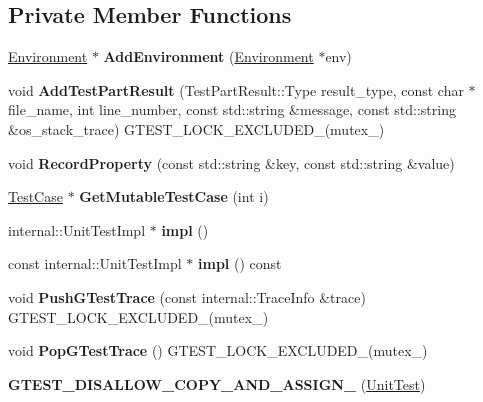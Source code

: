 \subsection*{Private Member Functions}
\begin{DoxyCompactItemize}
\item 
\mbox{\label{classtesting_1_1_unit_test_a1eb8e999b8696889bf1c64b4f0161203}} 
\mbox{\hyperlink{classtesting_1_1_environment}{Environment}} $\ast$ {\bfseries Add\+Environment} (\mbox{\hyperlink{classtesting_1_1_environment}{Environment}} $\ast$env)
\item 
\mbox{\label{classtesting_1_1_unit_test_a1d157d2e9a5c1d3405333410c6b13932}} 
void {\bfseries Add\+Test\+Part\+Result} (Test\+Part\+Result\+::\+Type result\+\_\+type, const char $\ast$file\+\_\+name, int line\+\_\+number, const std\+::string \&message, const std\+::string \&os\+\_\+stack\+\_\+trace) G\+T\+E\+S\+T\+\_\+\+L\+O\+C\+K\+\_\+\+E\+X\+C\+L\+U\+D\+E\+D\+\_\+(mutex\+\_\+)
\item 
\mbox{\label{classtesting_1_1_unit_test_a2c96a4a02c34095e07c6999e7686367f}} 
void {\bfseries Record\+Property} (const std\+::string \&key, const std\+::string \&value)
\item 
\mbox{\label{classtesting_1_1_unit_test_ad741830280b12c07874b2d37a6ee5c02}} 
\mbox{\hyperlink{classtesting_1_1_test_case}{Test\+Case}} $\ast$ {\bfseries Get\+Mutable\+Test\+Case} (int i)
\item 
\mbox{\label{classtesting_1_1_unit_test_a4df5d11a58affb337d7fa62eaa07690e}} 
internal\+::\+Unit\+Test\+Impl $\ast$ {\bfseries impl} ()
\item 
\mbox{\label{classtesting_1_1_unit_test_a266a9f49070d1959c1c9d649423879b4}} 
const internal\+::\+Unit\+Test\+Impl $\ast$ {\bfseries impl} () const
\item 
\mbox{\label{classtesting_1_1_unit_test_af455b953108ff09b3b6e41011653e78a}} 
void {\bfseries Push\+G\+Test\+Trace} (const internal\+::\+Trace\+Info \&trace) G\+T\+E\+S\+T\+\_\+\+L\+O\+C\+K\+\_\+\+E\+X\+C\+L\+U\+D\+E\+D\+\_\+(mutex\+\_\+)
\item 
\mbox{\label{classtesting_1_1_unit_test_a70b3e3282778bc9a36520fe0a8be3c57}} 
void {\bfseries Pop\+G\+Test\+Trace} () G\+T\+E\+S\+T\+\_\+\+L\+O\+C\+K\+\_\+\+E\+X\+C\+L\+U\+D\+E\+D\+\_\+(mutex\+\_\+)
\item 
\mbox{\label{classtesting_1_1_unit_test_a1e04cfb4f837cea288a98f2a64c43bba}} 
{\bfseries G\+T\+E\+S\+T\+\_\+\+D\+I\+S\+A\+L\+L\+O\+W\+\_\+\+C\+O\+P\+Y\+\_\+\+A\+N\+D\+\_\+\+A\+S\+S\+I\+G\+N\+\_\+} (\mbox{\hyperlink{classtesting_1_1_unit_test}{Unit\+Test}})
\end{DoxyCompactItemize}

